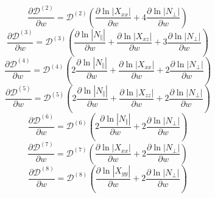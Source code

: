 \documentclass[a4paper,12pt]{article}%
\begin{document}
\begin{equation}
\frac{\partial\mathcal{D}^{\left(  2\right)  }}{\partial w}=\mathcal{D}%
^{\left(  2\right)  }\left(  \frac{\partial\ln\left\vert X_{xx}\right\vert
}{\partial w}+4\frac{\partial\ln\left\vert N_{\bot}\right\vert }{\partial
w}\right)
\end{equation}%
\begin{equation}
\frac{\partial\mathcal{D}^{\left(  3\right)  }}{\partial w}=\mathcal{D}%
^{\left(  3\right)  }\left(  \frac{\partial\ln\left\vert N_{\Vert}\right\vert
}{\partial w}+\frac{\partial\ln\left\vert X_{xz}\right\vert }{\partial
w}+3\frac{\partial\ln\left\vert N_{\bot}\right\vert }{\partial w}\right)
\end{equation}%
\begin{equation}
\frac{\partial\mathcal{D}^{\left(  4\right)  }}{\partial w}=\mathcal{D}%
^{\left(  4\right)  }\left(  2\frac{\partial\ln\left\vert N_{\Vert}\right\vert
}{\partial w}+\frac{\partial\ln\left\vert X_{xx}\right\vert }{\partial
w}+2\frac{\partial\ln\left\vert N_{\bot}\right\vert }{\partial w}\right)
\end{equation}%
\begin{equation}
\frac{\partial\mathcal{D}^{\left(  5\right)  }}{\partial w}=\mathcal{D}%
^{\left(  5\right)  }\left(  2\frac{\partial\ln\left\vert N_{\Vert}\right\vert
}{\partial w}+\frac{\partial\ln\left\vert X_{zz}\right\vert }{\partial
w}+2\frac{\partial\ln\left\vert N_{\bot}\right\vert }{\partial w}\right)
\end{equation}%
\begin{equation}
\frac{\partial\mathcal{D}^{\left(  6\right)  }}{\partial w}=\mathcal{D}%
^{\left(  6\right)  }\left(  2\frac{\partial\ln\left\vert N_{\Vert}\right\vert
}{\partial w}+2\frac{\partial\ln\left\vert N_{\bot}\right\vert }{\partial
w}\right)
\end{equation}%
\begin{equation}
\frac{\partial\mathcal{D}^{\left(  7\right)  }}{\partial w}=\mathcal{D}%
^{\left(  7\right)  }\left(  \frac{\partial\ln\left\vert X_{xx}\right\vert
}{\partial w}+2\frac{\partial\ln\left\vert N_{\bot}\right\vert }{\partial
w}\right)
\end{equation}%
\begin{equation}
\frac{\partial\mathcal{D}^{\left(  8\right)  }}{\partial w}=\mathcal{D}%
^{\left(  8\right)  }\left(  \frac{\partial\ln\left\vert X_{yy}\right\vert
}{\partial w}+2\frac{\partial\ln\left\vert N_{\bot}\right\vert }{\partial
w}\right)
\end{equation}%
\end{document}

